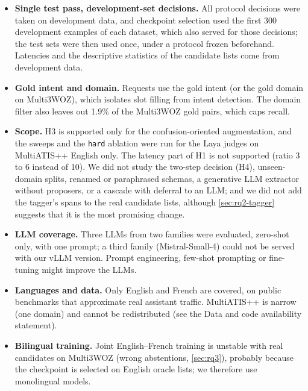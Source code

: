 \begin{itemize}
  \item \textbf{Single test pass, development-set decisions.} All protocol decisions were taken on development data, and checkpoint selection used the first 300 development examples of each dataset, which also served for those decisions; the test sets were then used once, under a protocol frozen beforehand. Latencies and the descriptive statistics of the candidate lists come from development data.
  \item \textbf{Gold intent and domain.} Requests use the gold intent (or the gold domain on Multi3WOZ), which isolates slot filling from intent detection. The domain filter also leaves out 1.9\% of the Multi3WOZ gold pairs, which caps recall.
  \item \textbf{Scope.} H3 is supported only for the confusion-oriented augmentation, and the sweeps and the \texttt{hard} ablation were run for the Laya judges on MultiATIS++ English only. The latency part of H1 is not supported (ratio 3 to 6 instead of 10). We did not study the two-step decision (H4), unseen-domain splits, renamed or paraphrased schemas, a generative LLM extractor without proposers, or a cascade with deferral to an LLM; and we did not add the tagger's spans to the real candidate lists, although \cref{sec:rq2-tagger} suggests that it is the most promising change.
  \item \textbf{LLM coverage.} Three LLMs from two families were evaluated, zero-shot only, with one prompt; a third family (Mistral-Small-4) could not be served with our vLLM version. Prompt engineering, few-shot prompting or fine-tuning might improve the LLMs.
  \item \textbf{Languages and data.} Only English and French are covered, on public benchmarks that approximate real assistant traffic. MultiATIS++ is narrow (one domain) and cannot be redistributed (see the Data and code availability statement).
  \item \textbf{Bilingual training.} Joint English--French training is unstable with real candidates on Multi3WOZ (wrong abstentions, \cref{sec:rq3}), probably because the checkpoint is selected on English oracle lists; we therefore use monolingual models.

\end{itemize}
